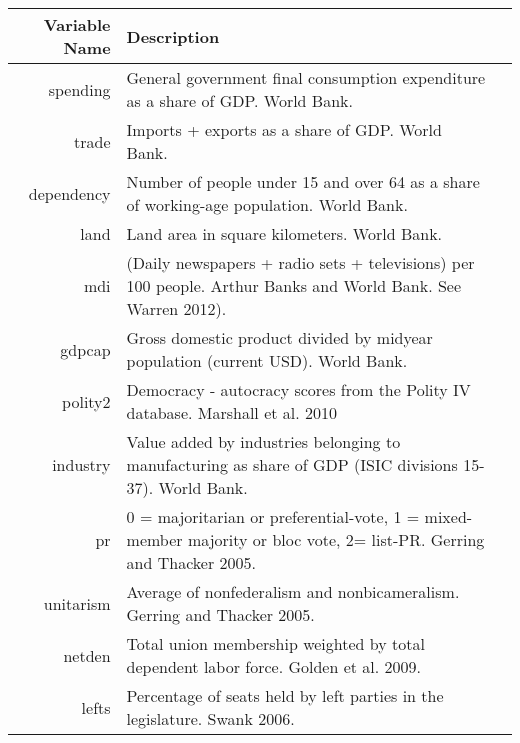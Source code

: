 
\begin{landscape}
\begin{table}[ht]
\begin{center}
\begin{tabular}{rll}
  \hline
 Variable Name & Description \\ 
  \hline
spending & General government final consumption expenditure as a share of GDP. World Bank.\\ 
trade & Imports + exports as a share of GDP. World Bank.\\ 
dependency & Number of people under 15 and over 64 as a share of working-age population. World Bank. \\ 
land & Land area in square kilometers. World Bank. \\ 
mdi & (Daily newspapers + radio sets + televisions) per 100 people. Arthur Banks and World Bank. See Warren 2012).\\ 
gdpcap & Gross domestic product divided by midyear population (current USD). World Bank. \\ 
polity2 & Democracy - autocracy scores from the Polity IV database. Marshall et al. 2010 \\ 
industry & Value added by industries belonging to manufacturing as share of GDP (ISIC divisions 15-37). World Bank.\\ 
pr & 0 = majoritarian or preferential-vote, 1 = mixed-member majority or bloc vote, 2= list-PR. Gerring and Thacker 2005. \\ 
unitarism & Average of nonfederalism and nonbicameralism. Gerring and Thacker 2005. \\ 
netden & Total union membership weighted by total dependent labor force. Golden et al. 2009. \\ 
lefts & Percentage of seats held by left parties in the legislature. Swank 2006. \\ 
   \hline
\end{tabular}
\end{center}
\end{table}
\end{landscape}
